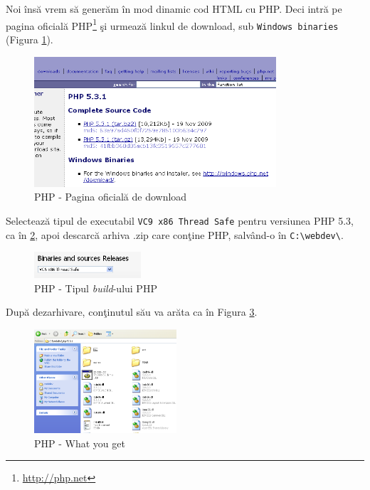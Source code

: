 Noi însă vrem să generăm în mod dinamic cod HTML cu PHP. Deci intră pe pagina oficială
PHP\footnote{\url{http://php.net}} şi urmează linkul de download,
sub \texttt{Windows binaries} (Figura \ref{fig:php win bin}).


\begin{figure}[h!]
  \centering
    \includegraphics[width=340px]{cap01/Screenshot-6.png}
  \caption{PHP - Pagina oficială de download}
  \label{fig:php win bin}
\end{figure}

Selectează tipul de executabil \texttt{VC9 x86 Thread Safe} pentru
versiunea PHP 5.3, ca în \ref{fig:php build type}, apoi
descarcă arhiva .zip care conţine PHP, salvând-o în \texttt{C:{\textbackslash}webdev\textbackslash}.
\begin{figure}[h!]
  \centering
    \includegraphics[width=150px]{cap01/Screenshot-7.png}
  \caption{PHP - Tipul \textsl{build}-ului PHP}
  \label{fig:php build type}
\end{figure}



După dezarhivare, conţinutul său va arăta ca în Figura \ref{fig:php what you get}.

\begin{figure}[h!]
  \centering
    \includegraphics[width=200px]{cap01/Screenshot-9.png}
  \caption{PHP - What you get}
  \label{fig:php what you get}
\end{figure}

